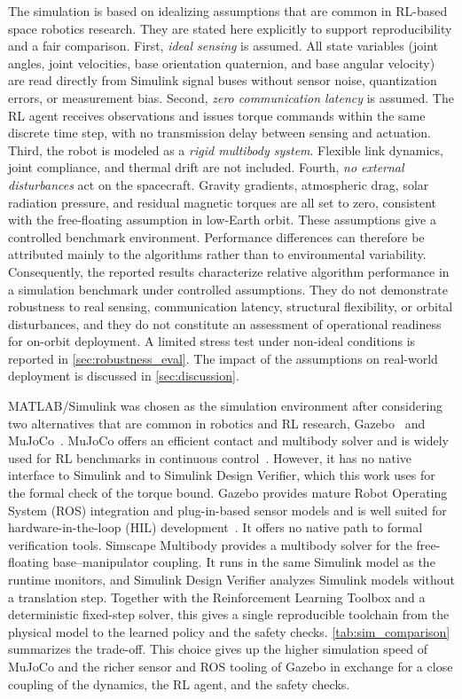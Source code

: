 \documentclass{ieeeaccess}
\begin{document}
The simulation is based on idealizing assumptions that are common in RL-based space robotics research. They are
stated here explicitly to support reproducibility and a fair comparison.
First, \emph{ideal sensing} is assumed. All state variables (joint angles, joint velocities, base orientation
quaternion, and base angular velocity) are read directly from Simulink signal buses without sensor
noise, quantization errors, or measurement bias. Second, \emph{zero communication latency} is assumed. The RL
agent receives observations and issues torque commands within the same discrete time step, with
no transmission delay between sensing and actuation. Third, the robot is modeled as a
\emph{rigid multibody system}. Flexible link dynamics, joint compliance, and thermal drift are not included.
Fourth, \emph{no external disturbances} act on the spacecraft. Gravity gradients, atmospheric drag, solar radiation
pressure, and residual magnetic torques are all set to zero, consistent with the free-floating
assumption in low-Earth orbit. These assumptions give a controlled benchmark environment. Performance differences
can therefore be attributed mainly to the algorithms rather than to environmental variability.
Consequently, the reported results characterize relative algorithm performance in a simulation benchmark under
controlled assumptions. They do not demonstrate robustness to real sensing, communication latency, structural
flexibility, or orbital disturbances, and they do not constitute an assessment of operational readiness for on-orbit
deployment. A limited stress test under non-ideal conditions is reported in \cref{sec:robustness_eval}. The
impact of the assumptions on real-world deployment is discussed in \cref{sec:discussion}.

MATLAB/Simulink was chosen as the simulation environment after considering two alternatives that are
common in robotics and RL research, Gazebo~\cite{koenig2004gazebo} and MuJoCo~\cite{todorov2012mujoco}.
MuJoCo offers an efficient contact and multibody solver and is widely used for RL benchmarks in
continuous control~\cite{korber2021comparing}. However, it has no native interface to Simulink and to
Simulink Design Verifier, which this work uses for the formal check of the torque bound. Gazebo provides
mature Robot Operating System (ROS) integration and plug-in-based sensor models and is well suited for
hardware-in-the-loop (HIL) development~\cite{collins2021review}. It offers no native path to formal
verification tools. Simscape Multibody provides a multibody solver for the free-floating
base--manipulator coupling. It runs in the same Simulink model as the runtime monitors, and Simulink
Design Verifier analyzes Simulink models without a translation step. Together with the Reinforcement
Learning Toolbox and a deterministic fixed-step solver, this gives a single reproducible toolchain from
the physical model to the learned policy and the safety checks. \cref{tab:sim_comparison} summarizes the
trade-off. This choice gives up the higher simulation speed of MuJoCo and the richer sensor and ROS
tooling of Gazebo in exchange for a close coupling of the dynamics, the RL agent, and the safety checks.
\end{document}
